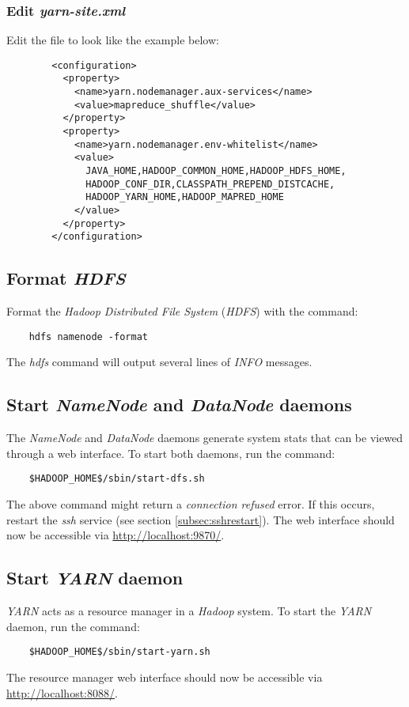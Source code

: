 \documentclass{article}
\begin{document}
        \subsubsection{Edit \emph{yarn-site.xml}}
        Edit the file  to look like the example below:
        \begin{verbatim}
        <configuration>
          <property>
            <name>yarn.nodemanager.aux-services</name>
            <value>mapreduce_shuffle</value>
          </property>
          <property>
            <name>yarn.nodemanager.env-whitelist</name>
            <value>
              JAVA_HOME,HADOOP_COMMON_HOME,HADOOP_HDFS_HOME,
              HADOOP_CONF_DIR,CLASSPATH_PREPEND_DISTCACHE,
              HADOOP_YARN_HOME,HADOOP_MAPRED_HOME
            </value>
          </property>
        </configuration>
        \end{verbatim}

    \subsection{Format \emph{HDFS}}
    Format the \emph{Hadoop Distributed File System} (\emph{HDFS}) with the command:
    \begin{verbatim}
    hdfs namenode -format
    \end{verbatim}
    The \emph{hdfs} command will output several lines of \emph{INFO} messages.

    \subsection{Start \emph{NameNode} and \emph{DataNode} daemons}
    The \emph{NameNode} and \emph{DataNode} daemons generate system stats that can be viewed
    through a web interface. To start both daemons, run the command:
    \begin{verbatim}
    $HADOOP_HOME$/sbin/start-dfs.sh
    \end{verbatim}
    The above command might return a \emph{connection refused} error. If this occurs, restart
    the \emph{ssh} service (see section \ref{subsec:sshrestart}). The web interface should now be
    accessible via \url{http://localhost:9870/}.

    \subsection{Start \emph{YARN} daemon}
    \emph{YARN} acts as a resource manager in a \emph{Hadoop} system. To start the \emph{YARN} daemon,
    run the command:
    \begin{verbatim}
    $HADOOP_HOME$/sbin/start-yarn.sh
    \end{verbatim}
    The resource manager web interface should now be accessible via
    \url{http://localhost:8088/}.
\end{document}

